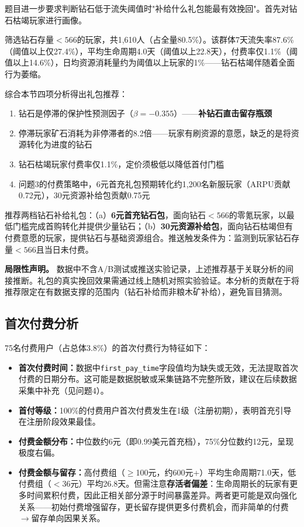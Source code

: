 题目进一步要求判断钻石低于流失阈值时"补给什么礼包能最有效挽回"。首先对钻石枯竭玩家进行画像。

筛选钻石存量$<566$的玩家，共1,610人（占全量80.5\%）。该群体7天流失率87.6\%（阈值以上仅27.4\%），平均生命周期4.0天（阈值以上22.8天），付费率仅1.1\%（阈值以上14.6\%），日均资源消耗量约为阈值以上玩家的1\%——钻石枯竭伴随着全面行为萎缩。

综合本节四项分析得出礼包推荐：

\begin{enumerate}
    \item 钻石是停滞的保护性预测因子（$\beta=-0.355$）——\textbf{补钻石直击留存瓶颈}
    \item 停滞玩家矿石消耗为非停滞者的8.2倍——玩家有刷资源的意愿，缺乏的是将资源转化为进度的钻石
    \item 钻石枯竭玩家付费率仅1.1\%，定价须极低以降低首付门槛
    \item 问题3的付费策略中，6元首充礼包预期转化约1,200名新服玩家（ARPU贡献0.72元），30元资源补给包贡献0.75元
\end{enumerate}

推荐两档钻石补给礼包：（a）\textbf{6元首充钻石包}，面向钻石$<566$的零氪玩家，以最低门槛完成首购转化并提供少量钻石；（b）\textbf{30元资源补给包}，面向钻石枯竭但有付费意愿的玩家，提供钻石与基础资源组合。推送触发条件为：监测到玩家钻石存量$<566$且当日未付费。

\textbf{局限性声明。} 数据中不含A/B测试或推送实验记录，上述推荐基于关联分析的间接推断。礼包的真实挽回效果需通过线上随机对照实验验证。本分析的贡献在于将推荐限定在有数据支撑的范围内（钻石补给而非粮木矿补给），避免盲目猜测。

\subsection{首次付费分析}

75名付费用户（占总体3.8\%）的首次付费行为特征如下：

\begin{itemize}
    \item \textbf{首次付费时间：}数据中\texttt{first\_pay\_time}字段值均为缺失或无效，无法提取首次付费的日期分布。这可能是数据脱敏或采集链路不完整所致，建议在后续数据采集中补充（见问题4）。
    \item \textbf{首付等级：}100\%的付费用户首次付费发生在1级（注册初期），表明首充引导在注册阶段效果最佳。
    \item \textbf{付费金额分布：}中位数约6元（即0.99美元首充档），75\%分位数约12元，呈现极度右偏。
    \item \textbf{付费金额与留存：}高付费组（$\geq$100元，约600元+）平均生命周期71.0天，低付费组（$<$36元）平均26.8天。但需注意\textbf{存活者偏差}：生命周期长的玩家有更多时间累积付费，因此正相关部分源于时间暴露差异。两者更可能是双向强化关系——初始付费增强留存，更长留存提供更多付费机会，而非简单的付费$\to$留存单向因果关系。
\end{itemize}

